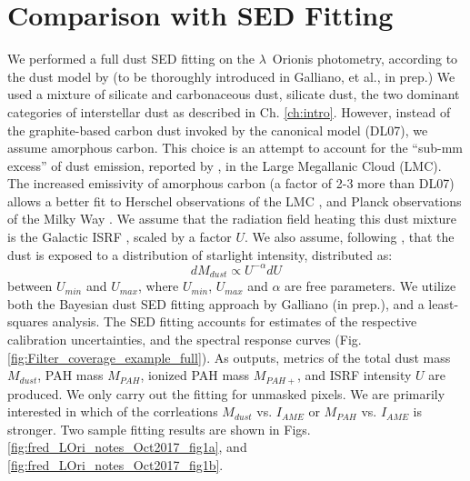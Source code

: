 {        \section{Comparison with SED Fitting}
          We performed a full dust SED fitting on the $\lambda$~Orionis photometry, according to the dust model by \cite{galliano11} (to be thoroughly introduced in Galliano, et al., in prep.)  We used a mixture of silicate and carbonaceous dust, silicate dust, the two dominant categories of interstellar dust as described in Ch. \ref{ch:intro}. However, instead of the graphite-based carbon dust invoked by the canonical \cite{draine07} model (DL07), we assume amorphous carbon. This choice is an attempt to account for the ``sub-mm excess'' of dust emission, reported by \cite{israel10, bot10}, in the Large Megallanic Cloud (LMC). The increased emissivity of amorphous carbon (a factor of 2-3 more than DL07) allows a better fit to Herschel observations of the LMC \citep{galliano11}, and Planck observations of the Milky Way \citep{planckIntXXIX16}. We assume that the radiation field heating this dust mixture is the Galactic ISRF \citep{mathis83}, scaled by a factor $U$. We also assume, following \cite{dale01}, that the dust is exposed to a distribution of starlight intensity, distributed as:
              \begin{equation}
                 \label{eq:U}
                   dM_{dust}\propto{} U^{-\alpha}dU
              \end{equation}
          between $U_{min}$ and $U_{max}$, where $U_{min}$, $U_{max}$ and $\alpha{}$ are free parameters.
          We utilize both the Bayesian dust SED fitting approach by Galliano (in prep.), and a least-squares analysis. The SED fitting accounts for estimates of the respective calibration uncertainties, and the spectral response curves (Fig. \ref{fig:Filter_coverage_example_full}). As outputs, metrics of the total dust mass $M_{dust}$, PAH mass $M_{PAH}$, ionized PAH mass $M_{PAH+}$, and ISRF intensity $U$ are produced. We only carry out the fitting for unmasked pixels. We are primarily interested in which of the corrleations $M_{dust}$ vs. $I_{AME}$ or $M_{PAH}$ vs. $I_{AME}$ is stronger.
          Two sample fitting results are shown in Figs. \ref{fig:fred_LOri_notes_Oct2017_fig1a}, and \ref{fig:fred_LOri_notes_Oct2017_fig1b}.
              \begin{figure}

\end{figure}}

